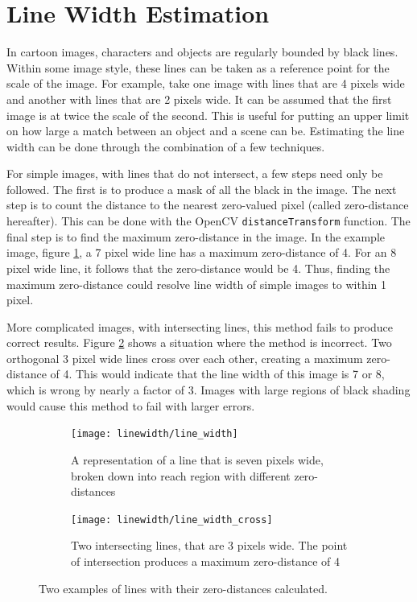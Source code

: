 \documentclass[../main.tex]{subfiles}
\begin{document}
  \section{Line Width Estimation}

  In cartoon images, characters and objects are regularly bounded by black lines.
  Within some image style, these lines can be taken as a reference point for the scale of the image.
  For example, take one image with lines that are 4 pixels wide and another with lines that are 2 pixels wide.
  It can be assumed that the first image is at twice the scale of the second.
  This is useful for putting an upper limit on how large a match between an object and a scene can be.
  Estimating the line width can be done through the combination of a few techniques.

  For simple images, with lines that do not intersect, a few steps need only be followed.
  The first is to produce a mask of all the black in the image.
  The next step is to count the distance to the nearest zero-valued pixel (called zero-distance hereafter).
  This can be done with the OpenCV \texttt{distanceTransform} function. %
  The final step is to find the maximum zero-distance in the image.
  In the example image, figure \ref{lineseven}, a 7 pixel wide line has a maximum zero-distance of 4.
  For an 8 pixel wide line, it follows that the zero-distance would be 4.
  Thus, finding the maximum zero-distance could resolve line width of simple images to within 1 pixel.

  More complicated images, with intersecting lines, this method fails to produce correct results.
  Figure \ref{linecross} shows a situation where the method is incorrect.
  Two orthogonal 3 pixel wide lines cross over each other, creating a maximum zero-distance of 4.
  This would indicate that the line width of this image is 7 or 8, which is wrong by nearly a factor of 3.
  Images with large regions of black shading would cause this method to fail with larger errors.

  \begin{figure}[h]
    \centering
    \begin{subfigure}[B]{0.9\textwidth}
      \centering
      \texttt{[image: linewidth/line\_width]}
      \caption{A representation of a line that is seven pixels wide, broken down into reach region with different zero-distances}
      \label{lineseven}
    \end{subfigure}

    \begin{subfigure}[B]{0.9\textwidth}
      \centering
      \texttt{[image: linewidth/line\_width\_cross]}
      \caption{Two intersecting lines, that are 3 pixels wide. The point of intersection produces a maximum zero-distance of 4}
      \label{linecross}
    \end{subfigure}
    \caption{Two examples of lines with their zero-distances calculated.}
    \label{linewidthexamples}
  \end{figure}
\end{document}
